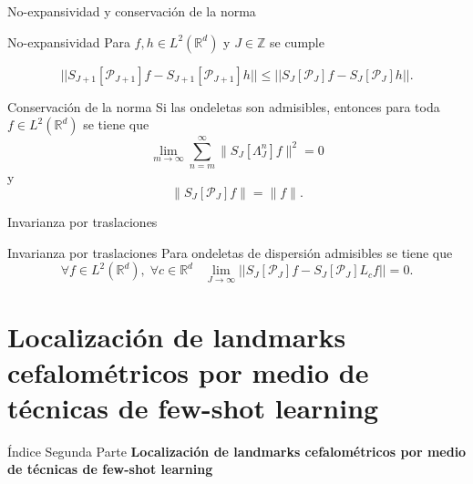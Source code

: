 \documentclass[aspectratio=43]{beamer}
\begin{document}
\begin{frame}{No-expansividad y conservación de la norma}

  \begin{alertblock}{No-expansividad}
    \noindent Para $f,h \in L^2(\mathbb{R}^d)$ y $J\in \mathbb{Z}$ se cumple

    \begin{equation*} \label{eq::1.10}
      || S_{J+1} [\mathcal{P}_{J+1}]f- S_{J+1}[\mathcal{P}_{J+1}]h || \leq ||S_J[\mathcal{P}_J]f - S_J[\mathcal{P}_J]h ||.
    \end{equation*}
  \end{alertblock}

  \begin{alertblock}{Conservación de la norma}
    Si las ondeletas son admisibles, entonces para toda $f\in L^2(\mathbb{R}^d)$ se tiene que
    \begin{equation*}
      \lim_{m\rightarrow\infty} \sum_{n=m}^{\infty} \|S_J[\Lambda_J^n]f\|^2=0
    \end{equation*}
    y
    \begin{equation*}
      \|S_J[\mathcal{P}_J]f\|=\|f\|.
    \end{equation*}
  \end{alertblock}
\end{frame}

\begin{frame}{Invarianza por traslaciones}
  \begin{alertblock}{Invarianza por traslaciones}
    Para ondeletas de dispersión admisibles se tiene que
    $$\forall f \in L^2(\mathbb{R}^d), \; \forall c\in \mathbb{R}^d \;\;\; \lim_{J\rightarrow \infty}||S_J[\mathcal{P}_J] f-S_J[\mathcal{P}_J] L_cf||=0.$$
  \end{alertblock}
\end{frame}

\part{Localización de landmarks cefalométricos por medio de técnicas de few-shot learning}

\begin{frame}{Índice Segunda Parte}
  \textcolor{tudCyan}{\textbf{Localización de landmarks cefalométricos por medio de técnicas de few-shot learning}}
  \medskip
  \tableofcontents[part=2]
\end{frame}

\end{document}
